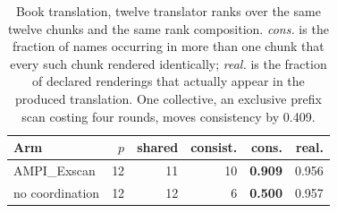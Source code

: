 \begin{table}[t]
\centering\small
\caption{Book translation, twelve translator ranks over the same twelve chunks and the same rank composition. \emph{cons.} is the fraction of names occurring in more than one chunk that every such chunk rendered identically; \emph{real.} is the fraction of declared renderings that actually appear in the produced translation. One collective, an exclusive prefix scan costing four rounds, moves consistency by 0.409.}
\label{tab:translation}
\begin{tabular}{@{}lrrrrr@{}}
\toprule
\textbf{Arm} & \textbf{$p$} & \textbf{shared} & \textbf{consist.} & \textbf{cons.} & \textbf{real.} \\
\midrule
AMPI\_Exscan & 12 & 11 & 10 & \textbf{0.909} & 0.956 \\
no coordination & 12 & 12 & 6 & \textbf{0.500} & 0.957 \\
\bottomrule
\end{tabular}
\end{table}
